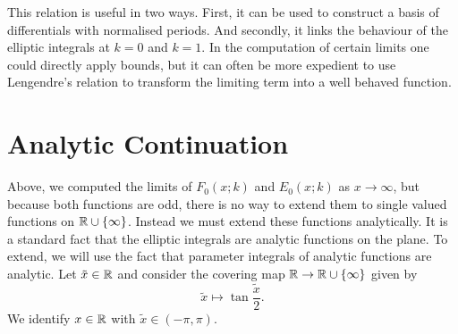 This relation is useful in two ways. First, it can be used to construct a basis of differentials with normalised periods. And secondly, it links the behaviour of the elliptic integrals at $k=0$ and $k=1$. In the computation of certain limits one could directly apply bounds, but it can often be more expedient to use Lengendre's relation to transform the limiting term into a well behaved function.









\section{Analytic Continuation}
\label{sec:EllipticContinuation}

Above, we computed the limits of $F_0(x;k)$ and $E_0(x;k)$ as $x \to \infty$, but because both functions are odd, there is no way to extend them to single valued functions on $\RInf$. Instead we must extend these functions analytically. It is a standard fact that the elliptic integrals are analytic functions on the plane. To extend, we will use the fact that parameter integrals of analytic functions are analytic. Let $\tilde{x}\in\R$ and consider the covering map $\R \to \RInf$ given by
\[
\tilde{x} \mapsto \tan\frac{\tilde{x}}{2}.
\]
We identify $x\in\R$ with $\tilde{x} \in (-π,π)$.

